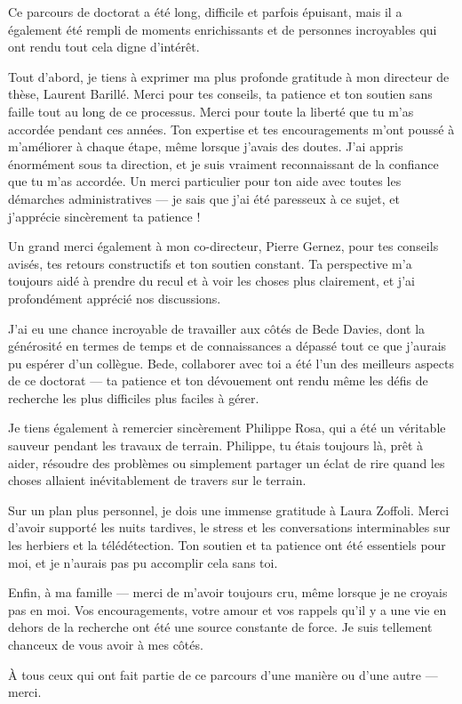 

Ce parcours de doctorat a été long, difficile et parfois épuisant, mais il a également été rempli de moments enrichissants et de personnes incroyables qui ont rendu tout cela digne d'intérêt.

Tout d'abord, je tiens à exprimer ma plus profonde gratitude à mon directeur de thèse, Laurent Barillé. Merci pour tes conseils, ta patience et ton soutien sans faille tout au long de ce processus. Merci pour toute la liberté que tu m'as accordée pendant ces années. Ton expertise et tes encouragements m'ont poussé à m'améliorer à chaque étape, même lorsque j'avais des doutes. J'ai appris énormément sous ta direction, et je suis vraiment reconnaissant de la confiance que tu m'as accordée. Un merci particulier pour ton aide avec toutes les démarches administratives — je sais que j'ai été paresseux à ce sujet, et j'apprécie sincèrement ta patience !

Un grand merci également à mon co-directeur, Pierre Gernez, pour tes conseils avisés, tes retours constructifs et ton soutien constant. Ta perspective m'a toujours aidé à prendre du recul et à voir les choses plus clairement, et j'ai profondément apprécié nos discussions.

J'ai eu une chance incroyable de travailler aux côtés de Bede Davies, dont la générosité en termes de temps et de connaissances a dépassé tout ce que j'aurais pu espérer d'un collègue. Bede, collaborer avec toi a été l'un des meilleurs aspects de ce doctorat — ta patience et ton dévouement ont rendu même les défis de recherche les plus difficiles plus faciles à gérer.

Je tiens également à remercier sincèrement Philippe Rosa, qui a été un véritable sauveur pendant les travaux de terrain. Philippe, tu étais toujours là, prêt à aider, résoudre des problèmes ou simplement partager un éclat de rire quand les choses allaient inévitablement de travers sur le terrain.

Sur un plan plus personnel, je dois une immense gratitude à Laura Zoffoli. Merci d'avoir supporté les nuits tardives, le stress et les conversations interminables sur les herbiers et la télédétection. Ton soutien et ta patience ont été essentiels pour moi, et je n'aurais pas pu accomplir cela sans toi.

Enfin, à ma famille — merci de m'avoir toujours cru, même lorsque je ne croyais pas en moi. Vos encouragements, votre amour et vos rappels qu'il y a une vie en dehors de la recherche ont été une source constante de force. Je suis tellement chanceux de vous avoir à mes côtés.

À tous ceux qui ont fait partie de ce parcours d'une manière ou d'une autre — merci.

